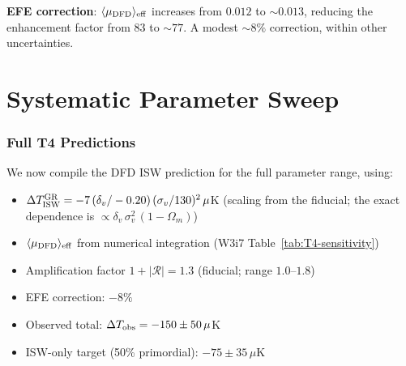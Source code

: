 \documentclass[11pt,a4paper]{article}
\newcommand{\mufd}{\mu_{\rm DFD}}
\newcommand{\Omm}{\Omega_m}
\begin{document}
\textbf{EFE correction}: $\langle\mufd\rangle_{\rm eff}$ increases from
$0.012$ to $\sim 0.013$, reducing the enhancement factor from $83$
to $\sim 77$. A modest $\sim 8\%$ correction, within other
uncertainties.


\part{Systematic Parameter Sweep}
\label{part:sweep}

\section{Full T4 Predictions}

We now compile the DFD ISW prediction for the full parameter range,
using:
\begin{itemize}[nosep]
\item $\Delta T_{\rm ISW}^{\rm GR} = -7\,(\delta_v/-0.20)\,
  (\sigma_v/130)^2\,\mu$K
  (scaling from the fiducial; the exact dependence is
  $\propto \delta_v\,\sigma_v^2\,(1-\Omm)$)
\item $\langle\mufd\rangle_{\rm eff}$ from numerical integration
  (W3i7 Table~\ref{tab:T4-sensitivity})
\item Amplification factor $1 + |\mathcal{R}| = 1.3$ (fiducial;
  range $1.0$--$1.8$)
\item EFE correction: $-8\%$
\item Observed total: $\Delta T_{\rm obs} = -150 \pm 50\,\mu$K
\item ISW-only target (50\% primordial): $-75 \pm 35\,\mu$K
\end{itemize}
\end{document}
